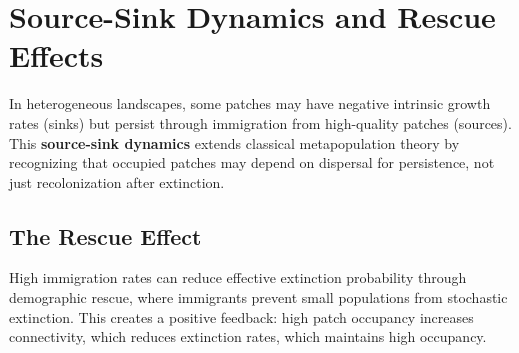 \documentclass[11pt,a4paper]{article}
\begin{document}
\section{Source-Sink Dynamics and Rescue Effects}

In heterogeneous landscapes, some patches may have negative intrinsic growth rates (sinks) but persist through immigration from high-quality patches (sources). This \textbf{source-sink dynamics} extends classical metapopulation theory by recognizing that occupied patches may depend on dispersal for persistence, not just recolonization after extinction.

\subsection{The Rescue Effect}

High immigration rates can reduce effective extinction probability through demographic rescue, where immigrants prevent small populations from stochastic extinction. This creates a positive feedback: high patch occupancy increases connectivity, which reduces extinction rates, which maintains high occupancy.
\end{document}
